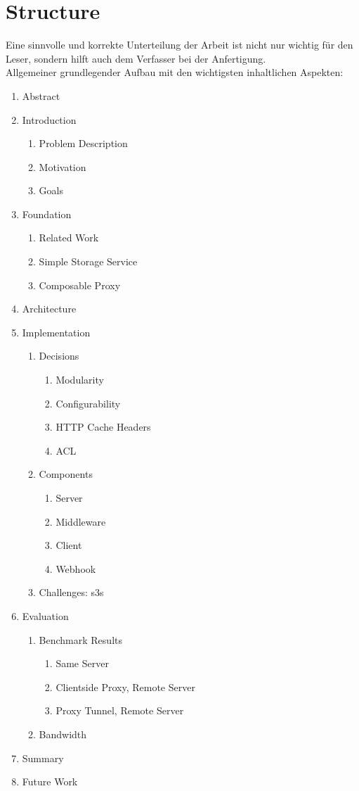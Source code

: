 \chapter{Structure}
\label{Structure}

Eine sinnvolle und korrekte Unterteilung der Arbeit ist nicht nur wichtig für den Leser, sondern hilft auch dem Verfasser bei der Anfertigung.\\
Allgemeiner grundlegender Aufbau mit den wichtigsten inhaltlichen Aspekten:

\begin{enumerate}
	\item Abstract
	\item Introduction
	\begin{enumerate}
		\item Problem Description
		\item Motivation
		\item Goals
	\end{enumerate}
	\item Foundation
	\begin{enumerate}
		\item Related Work
		\item Simple Storage Service
		\item Composable Proxy
	\end{enumerate}
	\item Architecture
	\item Implementation
	\begin{enumerate}
		\item Decisions
		\begin{enumerate}
			\item Modularity
			\item Configurability
			\item HTTP Cache Headers
			\item ACL
		\end{enumerate}
		\item Components
		\begin{enumerate}
			\item Server
			\item Middleware
			\item Client
			\item Webhook
		\end{enumerate}
		\item Challenges: s3s
	\end{enumerate}
	\item Evaluation
	\begin{enumerate}
		\item Benchmark Results
		\begin{enumerate}
			\item Same Server
			\item Clientside Proxy, Remote Server
			\item Proxy Tunnel, Remote Server
		\end{enumerate}
		\item Bandwidth
	\end{enumerate}
	\item Summary
	\item Future Work
\end{enumerate}